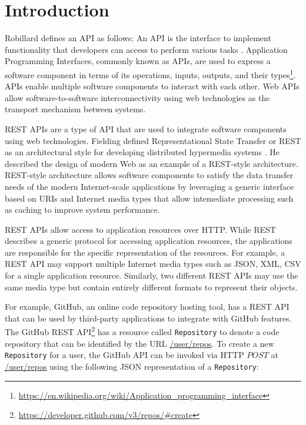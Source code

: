 \chapter{Introduction}

Robillard defines an API as follows: An API is the interface to implement functionality that developers can access to perform various tasks \cite{Robillard_a_field_study, Robillard_what_makes}. Application Programming Interfaces, commonly known as APIs, are used to express a software component in terms of its operations, inputs, outputs, and their types\footnote{\url{https://en.wikipedia.org/wiki/Application_programming_interface}}. APIs enable multiple software components to interact with each other. Web APIs allow software-to-software interconnectivity using web technologies as the transport mechanism between systems.

REST APIs are a type of API that are used to integrate software components using web technologies. Fielding defined Representational State Transfer or REST as an architectural style for developing distributed hypermedia systems \cite{Fielding_rest}. He described the design of modern Web as an example of a REST-style architecture. REST-style architecture allows software components to satisfy the data transfer needs of the modern Internet-scale applications by leveraging a generic interface based on URIs and Internet media types that allow intemediate processing such as caching to improve system performance.

REST APIs allow access to application resources over HTTP. While REST describes a generic protocol for accessing application resources, the applications are responsible for the specific representation of the resources. For example, a REST API may support multiple Internet media types such as JSON, XML, CSV for a single application resource. Similarly, two different REST APIs may use the same media type but contain entirely different formats to represent their objects.

For example, GitHub, an online code repository hosting tool, has a REST API that can be used by third-party applications to integrate with GitHub features. The GitHub REST API\footnote{\url{https://developer.github.com/v3/repos/\#create}} has a resource called \texttt{Repository} to denote a code repository that can be identified by the URL \url{/user/repos}. To create a new \texttt{Repository} for a user, the GitHub API can be invoked via HTTP $POST$ at \url{/user/repos} using the following JSON representation of a \texttt{Repository}:


